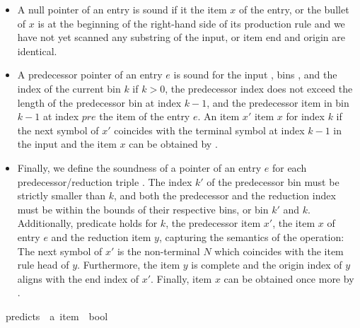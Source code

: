 \begin{isabellebody}
\begin{isamarkuptext}
\begin{itemize}
  \item A null pointer  of an entry is sound if it  the item $x$ of
    the entry, or the bullet of $x$ is at the beginning of the right-hand side of its production rule
    and we have not yet scanned any substring of the input, or item end and origin are identical.
  \item A predecessor pointer  of an entry $e$ is sound for the input \isa{{\isasymomega}}, bins ,
    and the index of the current bin $k$ if $k > 0$, the predecessor index does not exceed the length
    of the predecessor bin at index $k-1$, and the predecessor item in bin $k-1$ at index $pre$ 
    the item of the entry $e$. An item $x'$  item $x$ for index $k$ if the next symbol of
    $x'$ coincides with the terminal symbol at index $k-1$ in the input \isa{{\isasymomega}} and the item $x$ can be obtained
    by . 
  \item Finally, we define the soundness of a pointer  of an entry $e$ for each predecessor/reduction
    triple . The index $k'$ of the predecessor bin must be strictly
    smaller than $k$, and both the predecessor and the reduction index must be within the bounds of their
    respective bins, or bin $k'$ and $k$. Additionally, predicate  holds for $k$,
    the predecessor item $x'$, the item $x$ of entry $e$ and the reduction item $y$, capturing the semantics of
    the  operation: The next symbol of $x'$ is the non-terminal $N$ which coincides
    with the item rule head of $y$. Furthermore, the item $y$ is complete and the origin index of $y$
    aligns with the end index of $x'$. Finally, item $x$ can be obtained once more by .
\end{itemize}%
\end{isamarkuptext}\isamarkuptrue%
\isamarkupfalse%
\ predicts\ {\isacharcolon}{\kern0pt}{\isacharcolon}{\kern0pt}\ {\isachardoublequoteopen}{\isacharprime}{\kern0pt}a\ item\ {\isasymRightarrow}\ bool{\isachardoublequoteclose}\ \isanewline

\end{isabellebody}
